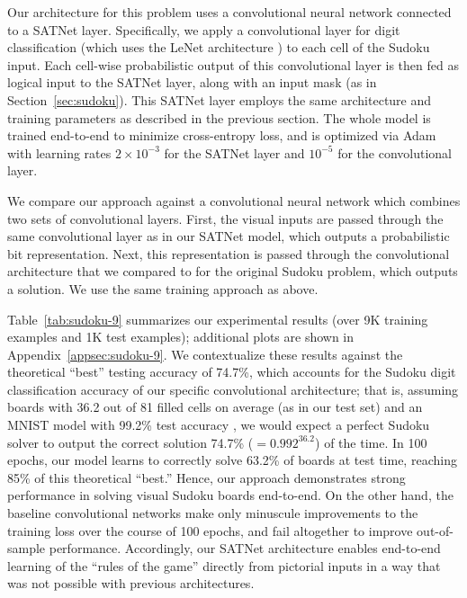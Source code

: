 \documentclass{article}
\begin{document}
	Our architecture for this problem uses a convolutional neural network connected to a SATNet layer. 
	Specifically, we apply a convolutional layer for digit classification (which uses the LeNet architecture \cite{lecun1998gradient}) to each cell of the Sudoku input.
	Each cell-wise probabilistic output of this convolutional layer is then fed as logical input to the SATNet layer, along with an input mask (as in Section~\ref{sec:sudoku}).
	This SATNet layer employs the same architecture and training parameters as described in the previous section.
	The whole model is trained end-to-end to minimize cross-entropy loss, and is optimized via Adam with learning rates $2\times 10^{-3}$ for the SATNet layer and $10^{-5}$ for the convolutional layer. 
	
	We compare our approach against a convolutional neural network which combines two sets of convolutional layers. First, the visual inputs are passed through the same convolutional layer as in our SATNet model, which outputs a probabilistic bit representation. Next, this representation is passed through the convolutional architecture that we compared to for the original Sudoku problem, which outputs a solution. We use the same training approach as above. 
	
	Table~\ref{tab:sudoku-9} summarizes our experimental results (over 9K training examples and 1K test examples); additional plots are shown in Appendix~\ref{appsec:sudoku-9}.
	We contextualize these results against the theoretical ``best'' testing accuracy of 74.7\%, which accounts for the Sudoku digit classification accuracy of our specific convolutional architecture;
	that is, assuming boards with 36.2 out of 81 filled cells on average (as in our test set) and 
an
	MNIST model with 99.2\% test accuracy \cite{lecun1998gradient}, we would expect a perfect Sudoku solver to output the correct solution 74.7\% ($= 0.992^{36.2}$) of the time.
	In 100 epochs, our model learns to correctly solve 63.2\% of boards at test time, reaching 85\% of this theoretical ``best.''
	Hence, our approach demonstrates strong performance in solving visual Sudoku boards end-to-end.
	On the other hand, the baseline convolutional networks make only minuscule improvements to the training loss over the course of 100 epochs, and fail altogether to improve out-of-sample performance.
	Accordingly, our SATNet architecture enables end-to-end learning of the ``rules of the game'' directly from pictorial inputs in a way that was not possible with previous architectures.
	
	
\end{document}
